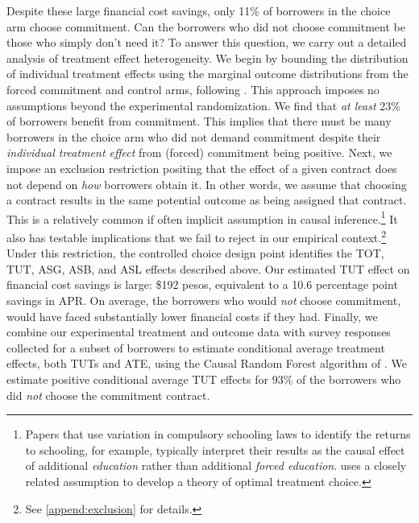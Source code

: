 \documentclass[11pt, a4paper]{article}
\begin{document}
Despite these large financial cost savings, only 11\% of borrowers in the choice arm choose commitment. 
Can the borrowers who did not choose commitment be those who simply don't need it? 
To answer this question, we carry out a detailed analysis of treatment effect heterogeneity.
We begin by bounding the distribution of individual treatment effects using the marginal outcome distributions from the forced commitment and control arms, following \cite{fan2010sharp}. This approach imposes no assumptions beyond the experimental randomization. We find that \textit{at least} 23\% of borrowers benefit from commitment. This implies that there must be many borrowers in the choice arm who did not demand commitment despite their \emph{individual treatment effect} from (forced) commitment being positive. Next, we impose an exclusion restriction positing that the effect of a given contract does not depend on \emph{how} borrowers obtain it. In other words, we assume that choosing a contract results in the same potential outcome as being assigned that contract. This is a relatively common if often implicit assumption in causal inference.\footnote{Papers that use variation in compulsory schooling laws to identify the returns to schooling, for example, typically interpret their results as the causal effect of additional \emph{education} rather than additional \emph{forced education}. \cite{chamberlain2011bayesian} uses a closely related assumption to develop a theory of optimal treatment choice.} 
It also has testable implications that we fail to reject in our empirical context.\footnote{See \ref{append:exclusion} for details.}
Under this restriction, the controlled choice design point identifies the TOT, TUT, ASG, ASB, and ASL effects described above.  Our estimated TUT effect on financial cost savings is large: \$192 pesos, equivalent to a 10.6 percentage point savings in APR. On average, the borrowers who would \textit{not} choose commitment, would have faced substantially lower financial costs if they had. Finally, we combine our experimental treatment and outcome data with survey responses collected for a subset of borrowers to estimate conditional average treatment effects, both TUTs and ATE, using the Causal Random Forest algorithm of \cite{atheygrf}. We estimate positive conditional average TUT effects for 93\% of the borrowers who did \textit{not} choose the commitment contract. 
\end{document}
